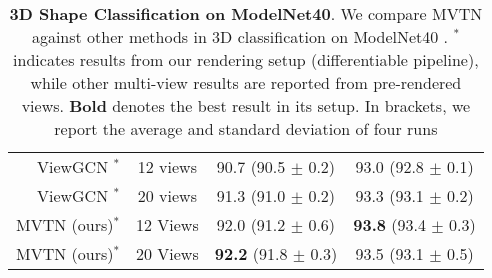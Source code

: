 \documentclass[10pt,twocolumn,letterpaper]{article}
\begin{document}
\begin{table*}[t]
{\begin{tabular}{rccc}
\midrule
ViewGCN \cite{mvviewgcn}$^*$& 12 views &    90.7 (90.5 $\pm$ 0.2)   &93.0 (92.8 $\pm$ 0.1) \\
ViewGCN \cite{mvviewgcn}$^*$& 20 views &    91.3 (91.0 $\pm$ 0.2)   &93.3 (93.1 $\pm$ 0.2) \\
MVTN (ours)$^*$  & 12 Views       & 92.0 (91.2 $\pm$ 0.6) & \textbf{93.8} (93.4 $\pm$ 0.3) \\
MVTN (ours)$^*$  & 20 Views       & \textbf{92.2} (91.8 $\pm$ 0.3) & 93.5 (93.1 $\pm$ 0.5) \\
\bottomrule
\end{tabular}
}
\vspace{2pt}
    \caption{\textbf{3D Shape Classification on ModelNet40}. We compare MVTN against other methods in 3D classification on ModelNet40 \cite{modelnet}. $^*$ indicates results from our rendering setup (differentiable pipeline), while other multi-view results are reported from pre-rendered views. \textbf{Bold} denotes the best result in its setup. In brackets, we report the average and standard deviation of four runs}
    \label{tab:ModelNet40-cls-supp}
\end{table*}
\end{document}
